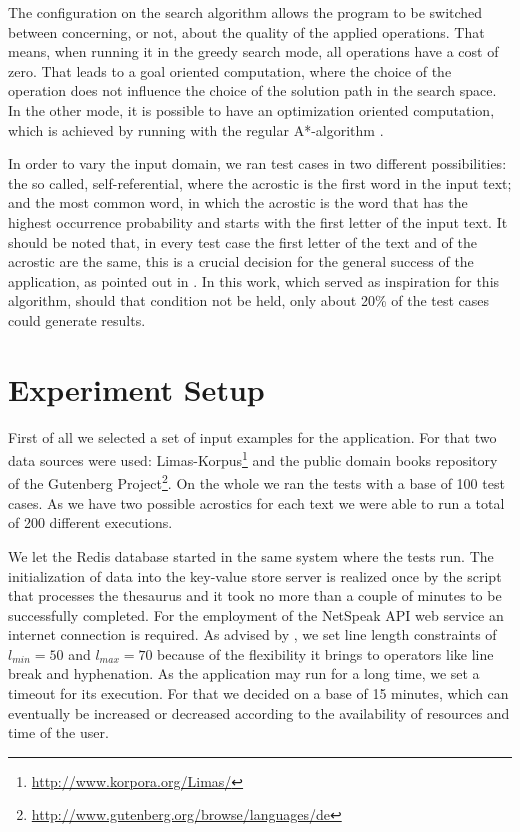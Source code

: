 \documentclass[11pt]{reportAlternative}
\begin{document}
The configuration on the search algorithm allows the program to be switched between concerning, or not, about the quality of the applied operations. That means, when running it in the greedy search mode, all operations have a cost of zero. That leads to a goal oriented computation, where the choice of the operation does not influence the choice of the solution path in the search space. In the other mode, it is possible to have an optimization oriented computation, which is achieved by running with the regular A*-algorithm \cite{AStar}.

In order to vary the input domain, we ran test cases in two different possibilities: the so called, self-referential, where the acrostic is the first word in the input text; and the most common word, in which the acrostic is the word that has the highest occurrence probability and starts with the first letter of the input text. It should be noted that, in every test case the first letter of the text and of the acrostic are the same, this is a crucial decision for the general success of the application, as pointed out in \cite{Stein}. In this work, which served as inspiration for this algorithm, should that condition not be held, only about 20\% of the test cases could generate results.

\section{Experiment Setup}
First of all we selected a set of input examples for the application. For that two data sources were used: Limas-Korpus\footnote{\url{http://www.korpora.org/Limas/}} and the public domain books repository of the Gutenberg Project\footnote{\url{http://www.gutenberg.org/browse/languages/de}}. On the whole we ran the tests with a base of  100 test cases. As we have two possible acrostics for each text we were able to run a total of 200 different executions.

We let the Redis database started in the same system where the tests run. The initialization of data into the key-value store server is realized once by the script that processes the thesaurus and it took no more than a couple of minutes to be successfully completed. For the employment of the NetSpeak API web service an internet connection is required. As advised by \cite{Stein}, we set line length constraints of $l_{min} = 50$ and $l_{max} = 70$ because of the flexibility it brings to operators like line break and hyphenation. As the application may run for a long time, we set a timeout for its execution. For that we decided on a base of 15 minutes, which can eventually be increased or decreased according to the availability of resources and time of the user.
\end{document}
